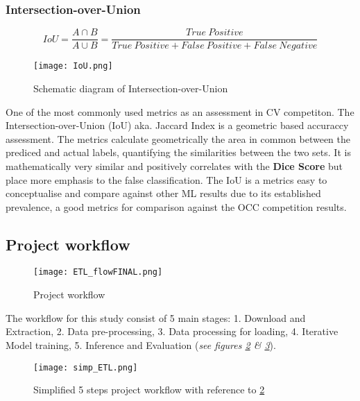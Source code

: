 \documentclass[11pt, a4paper, twoside]{report}
\begin{document}
\subsubsection{Intersection-over-Union}\label{IoU}

\begin{equation}
  IoU = \frac{A \cap B}{A \cup B} = \frac{True\ Positive}{True\ Positive + False\ Positive + False\ Negative}
\end{equation}

\begin{figure}[H]
  \centering
  \texttt{[image: IoU.png]}
  \caption{Schematic diagram of Intersection-over-Union}
  \label{fig:IoU}
\end{figure}

One of the most commonly used metrics as an assessment in CV competiton. The Intersection-over-Union (IoU) aka. Jaccard Index is a geometric based accuraccy assessment. The metrics calculate geometrically the area in common between the prediced and actual labels, quantifying the similarities between the two sets. It is mathematically very similar and positively correlates with the \textbf{Dice Score} but place more emphasis to the false classification. The IoU is a metrics easy to conceptualise and compare against other ML results due to its established prevalence, a good metrics for comparison against the OCC competition results.\\\par

\subsection{Project workflow}\label{ProjWorkflow}

\begin{figure}[H]
  \centering
  \texttt{[image: ETL\_flowFINAL.png]}
  \caption{Project workflow}
  \label{fig:ETL_flow}
\end{figure}

The workflow for this study consist of 5 main stages: 1. Download and Extraction, 2. Data pre-processing, 3. Data processing for loading, 4. Iterative Model training, 5. Inference and Evaluation (\textit{see figures \ref{fig:ETL_flow} \& \ref{fig:simp_ETL}}).

\begin{figure}[H]
  \centering
  \texttt{[image: simp\_ETL.png]}
  \caption{Simplified 5 steps project workflow with reference to \ref{fig:ETL_flow}}
  \label{fig:simp_ETL}
\end{figure}
\end{document}

